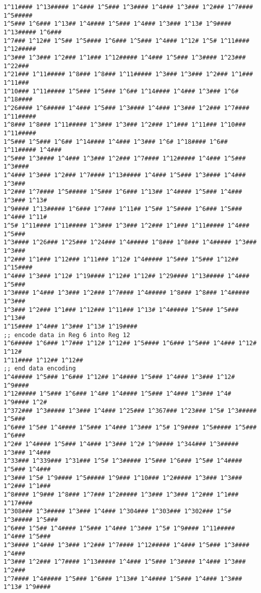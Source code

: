 \begin{@twocolumnfalse}
\begin{lstlisting}
1^11#### 1^13##### 1^4### 1^5### 1^3#### 1^4### 1^3### 1^2### 1^7#### 1^5#####
1^5### 1^6### 1^13## 1^4#### 1^5### 1^4### 1^3### 1^13# 1^9#### 1^13##### 1^6###
1^7### 1^12## 1^5## 1^5#### 1^6### 1^5### 1^4### 1^12# 1^5# 1^11#### 1^12#####
1^3### 1^3### 1^2### 1^1### 1^12##### 1^4### 1^5### 1^3#### 1^23### 1^22###
1^21### 1^11##### 1^8### 1^8### 1^11##### 1^3### 1^3### 1^2### 1^1### 1^11###
1^10### 1^11##### 1^5### 1^5### 1^6## 1^14#### 1^4### 1^3### 1^6# 1^18####
1^26#### 1^6##### 1^4### 1^5### 1^3#### 1^4### 1^3### 1^2### 1^7#### 1^11#####
1^8### 1^8### 1^11##### 1^3### 1^3### 1^2### 1^1### 1^11### 1^10### 1^11#####
1^5### 1^5### 1^6## 1^14#### 1^4### 1^3### 1^6# 1^18#### 1^6## 1^11##### 1^4###
1^5### 1^3#### 1^4### 1^3### 1^2### 1^7#### 1^12##### 1^4### 1^5### 1^3####
1^4### 1^3### 1^2### 1^7#### 1^13##### 1^4### 1^5### 1^3#### 1^4### 1^3###
1^2### 1^7#### 1^5##### 1^5### 1^6### 1^13## 1^4#### 1^5### 1^4### 1^3### 1^13#
1^9#### 1^13##### 1^6### 1^7### 1^11## 1^5## 1^5#### 1^6### 1^5### 1^4### 1^11#
1^5# 1^11#### 1^11##### 1^3### 1^3### 1^2### 1^1### 1^11##### 1^4### 1^5###
1^3#### 1^26### 1^25### 1^24### 1^4##### 1^8### 1^8### 1^4##### 1^3### 1^3###
1^2### 1^1### 1^12### 1^11### 1^12# 1^4##### 1^5### 1^5### 1^12## 1^15####
1^4### 1^3### 1^12# 1^19#### 1^12## 1^12## 1^29#### 1^13##### 1^4### 1^5###
1^3#### 1^4### 1^3### 1^2### 1^7#### 1^4##### 1^8### 1^8### 1^4##### 1^3###
1^3### 1^2### 1^1### 1^12### 1^11### 1^13# 1^4##### 1^5### 1^5### 1^13##
1^15#### 1^4### 1^3### 1^13# 1^19####
;; encode data in Reg 6 into Reg 12
1^6##### 1^6### 1^7### 1^12# 1^12## 1^5#### 1^6### 1^5### 1^4### 1^12# 1^12#
1^11#### 1^12## 1^12##
;; end data encoding
1^4##### 1^5### 1^6### 1^12## 1^4#### 1^5### 1^4### 1^3### 1^12# 1^9####
1^12##### 1^5### 1^6### 1^4## 1^4#### 1^5### 1^4### 1^3### 1^4# 1^9#### 1^2#
1^372### 1^3##### 1^3### 1^4### 1^25### 1^367### 1^23### 1^5# 1^3##### 1^5###
1^6### 1^5## 1^4#### 1^5### 1^4### 1^3### 1^5# 1^9#### 1^5##### 1^5### 1^6###
1^2## 1^4#### 1^5### 1^4### 1^3### 1^2# 1^9#### 1^344### 1^3##### 1^3### 1^4###
1^33### 1^339### 1^31### 1^5# 1^3##### 1^5### 1^6### 1^5## 1^4#### 1^5### 1^4###
1^3### 1^5# 1^9#### 1^5##### 1^9### 1^10### 1^2##### 1^3### 1^3### 1^2### 1^1###
1^8#### 1^9### 1^8### 1^7### 1^2##### 1^3### 1^3### 1^2### 1^1### 1^17####
1^308### 1^3##### 1^3### 1^4### 1^304### 1^303### 1^302### 1^5# 1^3##### 1^5###
1^6### 1^5## 1^4#### 1^5### 1^4### 1^3### 1^5# 1^9#### 1^11##### 1^4### 1^5###
1^3#### 1^4### 1^3### 1^2### 1^7#### 1^12##### 1^4### 1^5### 1^3#### 1^4###
1^3### 1^2### 1^7#### 1^13##### 1^4### 1^5### 1^3#### 1^4### 1^3### 1^2###
1^7#### 1^4##### 1^5### 1^6### 1^13## 1^4#### 1^5### 1^4### 1^3### 1^13# 1^9####

\end{lstlisting}
\end{@twocolumnfalse}
